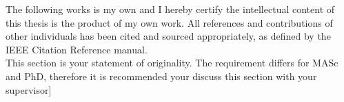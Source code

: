 {}

The following works is my own and I hereby certify the intellectual content of this thesis is the product of my own work. All references and contributions of other individuals has been cited and sourced appropriately, as defined by the IEEE Citation Reference manual.\\[0.3in]

This section is your statement of originality. The requirement differs for MASc and PhD, therefore it is recommended your discuss this section with your supervisor] 

